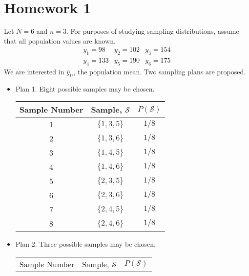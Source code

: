 \documentclass[12pt]{article}
\begin{document}

    
    \section{Homework 1}

    \begin{exercise}[Lohr-2.1]
        Let $N = 6$ and $n = 3$. For purposes of studying sampling distributions, assume that all population values are known. 
        \[
            \begin{array}{cll}
            y_{1}=98 & y_{2}=102 & y_{3}=154 \\
            y_{4}=133 & y_{5}=190 & y_{6}=175
            \end{array}
        \]
        We are interested in \(\bar{y}_U\), the population mean. Two sampling plans are proposed. 
        \begin{itemize}
            \item Plan 1. Eight possible samples may be chosen. 
            \begin{center}
                \begin{tabular}{ccc} 
                    Sample Number & Sample, \(\mathcal{S}\) & \(P(\mathcal{S})\) \\
                    \hline 1 & \(\{1,3,5\}\) & \(1 / 8\) \\
                    2 & \(\{1,3,6\}\) & \(1 / 8\) \\
                    3 & \(\{1,4,5\}\) & \(1 / 8\) \\
                    4 & \(\{1,4,6\}\) & \(1 / 8\) \\
                    5 & \(\{2,3,5\}\) & \(1 / 8\) \\
                    6 & \(\{2,3,6\}\) & \(1 / 8\) \\
                    7 & \(\{2,4,5\}\) & \(1 / 8\) \\
                    8 & \(\{2,4,6\}\) & \(1 / 8\)
                \end{tabular}
            \end{center}
            \item Plan 2. Three possible samples may be chosen.
            \begin{center}
                \begin{tabular}{ccc} 
                    Sample Number & Sample, \(\mathcal{S}\) & \(P(\mathcal{S})\) \\

\end{tabular}
\end{center}
\end{itemize}
\end{exercise}
\end{document}

